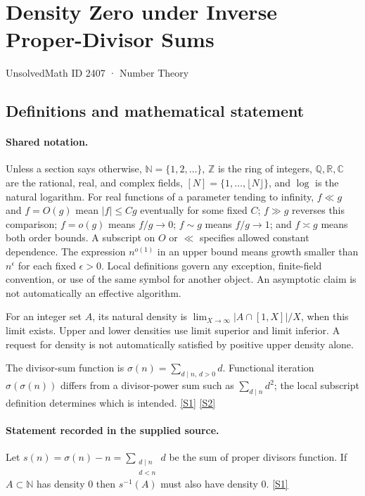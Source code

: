 \documentclass[11pt,a4paper]{article}
\newcommand{\N}{\mathbb{N}}
\newcommand{\Z}{\mathbb{Z}}
\newcommand{\Q}{\mathbb{Q}}
\newcommand{\R}{\mathbb{R}}
\newcommand{\C}{\mathbb{C}}
\newcommand{\sref}[2]{\hyperlink{source:#1:#2}{[S#2]}}
\begin{document}

\setcounter{section}{2406}

\section{Density Zero under Inverse Proper-Divisor Sums}\label{2407}

{\small\sffamily UnsolvedMath ID 2407 · Number Theory}

\subsection{Definitions and mathematical statement}

\paragraph{Shared notation.}Unless a section says otherwise, $\N=\{1,2,\ldots\}$,
$\Z$ is the ring of integers, $\Q,\R,\C$ are the rational, real, and complex
fields, $[N]=\{1,\ldots,\lfloor N\rfloor\}$, and $\log$ is the natural
logarithm. For real functions of a parameter tending to infinity,
$f\ll g$ and $f=O(g)$ mean $|f|\leq Cg$ eventually for some fixed $C$;
$f\gg g$ reverses this comparison; $f=o(g)$ means $f/g\to0$;
$f\sim g$ means $f/g\to1$; and $f\asymp g$ means both order bounds.
A subscript on $O$ or $\ll$ specifies allowed constant dependence.
The expression $n^{o(1)}$ in an upper bound means growth smaller than
$n^\epsilon$ for each fixed $\epsilon>0$. Local definitions govern any
exception, finite-field convention, or use of the same symbol for another
object. An asymptotic claim is not automatically an effective algorithm.



For an integer set $A$, its natural density is $\lim_{X\to\infty}|A\cap[1,X]|/X$, when this limit exists. Upper and lower densities use limit superior and limit inferior. A request for density is not automatically satisfied by positive upper density alone.

The divisor-sum function is $\sigma(n)=\sum_{d\mid n,\,d>0}d$. Functional iteration $\sigma(\sigma(n))$ differs from a divisor-power sum such as $\sum_{d\mid n}d^2$; the local subscript definition determines which is intended. \sref{2407}{1} \sref{2407}{2}

\paragraph{Statement recorded in the supplied source.}
Let $ s(n)=\sigma(n)-n=\sum_{\substack{d\mid n\\ d<n}}d $ be the sum of proper divisors function.
If $A\subset \mathbb{N}$ has density $0$ then $s^{-1}(A)$ must also have density $0$. \sref{2407}{1}
\end{document}
